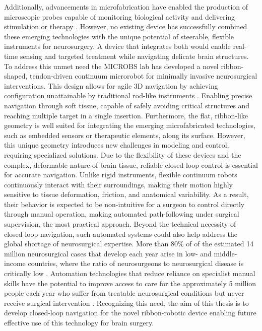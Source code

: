 Additionally, advancements in microfabrication have enabled the production of microscopic probes capable of monitoring biological activity and delivering stimulation or therapy \cite{chen_neural_2017} \cite{frank_next-generation_2019}.  However, no existing device has successfully combined these emerging technologies with the unique potential of steerable, flexible instruments for neurosurgery. A device that integrates both would enable real-time sensing and targeted treatment while navigating delicate brain structures.
\newline \newline
To address this unmet need the MICROBS lab has developed a novel ribbon-shaped, tendon-driven continuum microrobot for minimally invasive neurosurgical interventions. This design allows for agile 3D navigation by achieving configuration unattainable by traditional rod-like instruments \cite{noseda_flat_2024}. Enabling precise navigation through soft tissue, capable of safely avoiding critical structures and reaching multiple target in a single insertion.  Furthermore, the flat, ribbon-like geometry is well suited for integrating the emerging microfabricated technologies, such as embedded sensors or therapeutic elements, along its surface. However, this unique geometry introduces new challenges in modeling and control, requiring specialized solutions. 
\newline \newline 
Due to the flexibility of these devices and the complex, deformable nature of brain tissue, reliable closed-loop control is essential for accurate navigation. Unlike rigid instruments, flexible continuum robots continuously interact with their surroundings, making their motion highly sensitive to tissue deformation, friction, and anatomical variability. As a result, their behavior is expected to be non-intuitive for a surgeon to control directly through manual operation, making automated path-following under surgical supervision, the most practical approach.
\newline \newline 
Beyond the technical necessity of closed-loop navigation, such automated systems could also help address the global shortage of neurosurgical expertise. More than 80\% of of the estimated 14 million neurosurgical cases that develop each year arise in low- and middle-income countries, where the ratio of neurosurgeons to neurosurgical disease is critically low \cite{dewan_global_2019}. Automation technologies that reduce reliance on specialist manual skills have the potential to improve access to care for the approximately 5 million people each year who suffer from treatable neurosurgical conditions but never receive surgical intervention \cite{dewan_global_2019}.
\newline \newline 
Recognizing this need, the aim of this thesis is to develop closed-loop navigation for the novel ribbon-robotic device enabling future effective use of this technology for brain surgery. 


